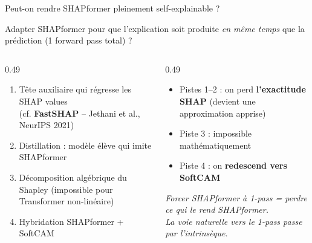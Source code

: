 \documentclass[10pt]{beamer}
\begin{document}
\begin{frame}{Peut-on rendre SHAPformer pleinement self-explainable ?}
  \begin{tcolorbox}[colback=blue!3, colframe=blue!50!black, arc=2mm,
                    fonttitle=\bfseries, title=Question explorée]
    Adapter SHAPformer pour que l'explication soit produite \emph{en même temps} que la prédiction (1 forward pass total) ?
  \end{tcolorbox}

  \begin{columns}
    \begin{column}{0.49\textwidth}
      \begin{tcolorbox}[colback=orange!3, colframe=orange!60!black, arc=2mm,
                        fonttitle=\bfseries, title=Pistes techniques]
        \begin{enumerate}
          \item Tête auxiliaire qui régresse les SHAP values\\
                {\footnotesize (cf. \textbf{FastSHAP} -- Jethani et al., NeurIPS 2021)}
          \item Distillation : modèle élève qui imite SHAPformer
          \item Décomposition algébrique du Shapley (impossible pour Transformer non-linéaire)
          \item Hybridation SHAPformer + SoftCAM
        \end{enumerate}
      \end{tcolorbox}
    \end{column}
    \begin{column}{0.49\textwidth}
      \begin{tcolorbox}[colback=red!3, colframe=red!60!black, arc=2mm,
                        fonttitle=\bfseries, title={Conclusion : non, sans dénaturer}]
        \begin{itemize}
          \item Pistes 1--2 : on perd \textbf{l'exactitude SHAP} (devient une approximation apprise)
          \item Piste 3 : impossible mathématiquement
          \item Piste 4 : on \textbf{redescend vers SoftCAM}
        \end{itemize}
        \vspace{2pt}\centering
        \emph{Forcer SHAPformer à 1-pass = perdre ce qui le rend SHAPformer.\\La voie naturelle vers le 1-pass passe par l'intrinsèque.}
      \end{tcolorbox}
    \end{column}
  \end{columns}
\end{frame}
\end{document}
